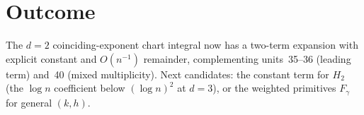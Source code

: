 \documentclass[11pt]{article}
\begin{document}
\section{Outcome}
The $d=2$ coinciding-exponent chart integral now has a two-term expansion with explicit constant and
$O(n^{-1})$ remainder, complementing units~35--36 (leading term) and~40 (mixed multiplicity). Next
candidates: the constant term for $H_2$ (the $\log n$ coefficient below $(\log n)^2$ at $d=3$), or the
weighted primitives $F_\gamma$ for general $(k,h)$.
\end{document}
